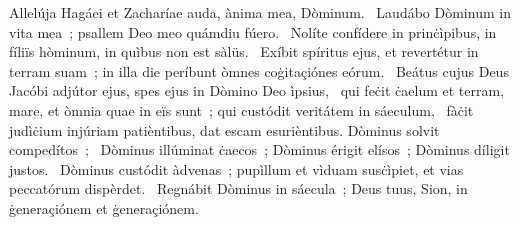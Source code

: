 { Allelúja Hagáei et Zacharíae}
{%
auda, ànima mea, Dòminum. 
~Laudábo Dòminum in vita mea~; psallem Deo meo quámdiu fúero. 
~Nolíte confídere in prinċìpibus, in fíliïs hòminum, in quìbus non est sàlüs. 
~Exíbit spíritus ejus, et revertétur in terram suam~; in illa die períbunt òmnes coġitaçiónes eórum. 
~Beátus cujus Deus Jacóbi adjútor ejus, spes ejus in Dòmino Deo ìpsius, 
~qui feċit ċaelum et terram, mare, et òmnia quae in eïs sunt~; qui custódit veritátem in sáeculum, 
~fàċit judìċium injúriam patièntibus, dat escam esurièntibus. Dòminus solvit compedítos~; 
~Dòminus illúminat ċaecos~; Dòminus érigit elísos~; Dòminus díligit justos. 
~Dòminus custódit àdvenas~; pupìllum et vìduam susċìpiet, et vias peccatórum dispèrdet. 
~Regnábit Dòminus in sáecula~; Deus tuus, Sion, in ġeneraçiónem et ġeneraçiónem. 
}
